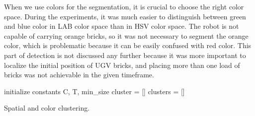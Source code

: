 When we use colors for the segmentation, it is crucial to choose the right color space. During the experiments, it was much easier to distinguish between green and blue color in LAB color space than in HSV color space. The robot is not capable of carrying orange bricks, so it was not necessary to segment the orange color, which is problematic because it can be easily confused with red color. This part of detection is not discussed any further because it was more important to localize the initial position of UGV bricks, and placing more than one load of bricks was not achievable in the given timeframe.

\begin{algorithm}[H]
	initialize constants C, T, min\_size \;
	cluster = []\;
	clusters = []\;
	\caption{Spatial and color clustering.}
	\label{alg:clustering}
\end{algorithm}

\vspace{3mm}

